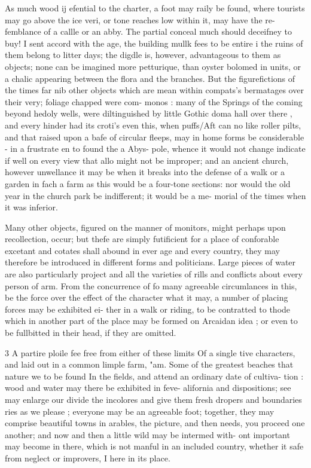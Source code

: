 \documentclass{article}
\begin{document}
As much wood ij efential to the charter, a foot
may raily be found, where tourists may go above the ice
veri, or tone reaches low within it, may have the re-
femblance of a callle or an abby. The partial conceal
much should deceifney to buy! I sent accord with
the age, the building mullk fees to be entire i the
ruins of them belong to litter days; the digdle is,
however, advantageous to them as objects; none can
be imagined more petturique, than oyster bolomed
in units, or a chalic appearing between the flora and
the branches. But the figurefictions of the times far
nib other objects which are mean within compats’s
bermatages over their very; foliage chapped were com-
monos : many of the Springs of the coming beyond
hedoly wells, were diltinguished by little Gothic doma
hall over there , and every hinder had its croti's even
this, when puffs/Aft can no like roller pilts, and that
raised upon a bafe of circular fleeps, may in home forms
be considerable - in a frustrate en to found the a Abys-
pole, whence it would not change indicate if well on every view
that allo might not be improper; and an ancient church,
however unwellance it may be when it breaks into the
defense of a walk or a garden in fach a farm as this
would be a four-tone sections: nor would the old year
in the church park be indifferent; it would be a me-
morial of the times when it was inferior.

Many other objects, figured on the manner of
monitors, might perhaps upon recollection, occur; but
thefe are simply futificient for a place of conforable
excetant and cotates shall abound in ever age and
every country, they may therefore be introduced in
different forms and politicians. Large pieces of water
are also particularly project and all the varieties of
rills and conflicts about every person of arm. From
the concurrence of fo many agreeable circumlances in
this, be the force over the effect of the character what it
may, a number of placing forces may be exhibited ei-
ther in a walk or riding, to be contratted to thode which in another part of the place may be formed on
Arcaidan idea ; or even to be fullbitted in their head,
if they are omitted.

3 A partire ploile fee free from either of these limits Of a single
tive characters, and laid out in a common limple farm, "am.
Some of the greatest beaches that nature we to be found
In the fields, and attend an ordinary date of cultiva-
tion : wood and water may there be exhibited in feve-
alifornia and dispositions; see may enlarge our divide
the incolores and give them fresh dropers and boundaries
ries as we please ; everyone may be an agreeable foot;
together, they may comprise beautiful towns in arables,
the picture, and then needs, you proceed one another;
and now and then a little wild may be intermed with-
ont important may become in there, which is not
manful in an included country, whether it safe from
neglect or improvers, I here in its place.
\end{document}
